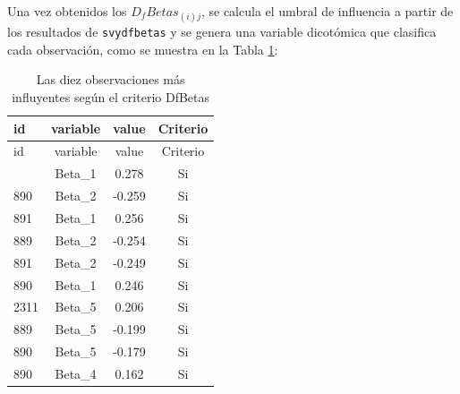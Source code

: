 \documentclass[
  spanish,
  12pt,
]{book}
\newenvironment{Shaded}{\begin{snugshade}}{\end{snugshade}}
\newcommand{\AttributeTok}[1]{\textcolor[rgb]{0.13,0.29,0.53}{#1}}
\newcommand{\DataTypeTok}[1]{\textcolor[rgb]{0.13,0.29,0.53}{#1}}
\newcommand{\DecValTok}[1]{\textcolor[rgb]{0.00,0.00,0.81}{#1}}
\newcommand{\FunctionTok}[1]{\textcolor[rgb]{0.13,0.29,0.53}{\textbf{#1}}}
\newcommand{\NormalTok}[1]{#1}
\newcommand{\OtherTok}[1]{\textcolor[rgb]{0.56,0.35,0.01}{#1}}
\newcommand{\SpecialCharTok}[1]{\textcolor[rgb]{0.81,0.36,0.00}{\textbf{#1}}}
\newcommand{\StringTok}[1]{\textcolor[rgb]{0.31,0.60,0.02}{#1}}
\begin{document}
Una vez obtenidos los \(D_{f}Betas_{\left(i\right)j}\), se calcula el umbral de influencia a partir de los resultados de \texttt{svydfbetas} y se genera una variable dicotómica que clasifica cada observación, como se muestra en la Tabla \ref{tab:tab-dfbetas-influyentes}:

\begin{Shaded}
\end{Shaded}

\begin{longtable}[]{@{}lccc@{}}
\caption{\label{tab:tab-dfbetas-influyentes}Las diez observaciones más influyentes según el criterio DfBetas}\tabularnewline
\toprule\noalign{}
id & variable & value & Criterio \\
\midrule\noalign{}
\endfirsthead
\toprule\noalign{}
id & variable & value & Criterio \\
\midrule\noalign{}
\endhead
\bottomrule\noalign{}
\endlastfoot
889 & Beta\_1 & 0.278 & Si \\
890 & Beta\_2 & -0.259 & Si \\
891 & Beta\_1 & 0.256 & Si \\
889 & Beta\_2 & -0.254 & Si \\
891 & Beta\_2 & -0.249 & Si \\
890 & Beta\_1 & 0.246 & Si \\
2311 & Beta\_5 & 0.206 & Si \\
889 & Beta\_5 & -0.199 & Si \\
890 & Beta\_5 & -0.179 & Si \\
890 & Beta\_4 & 0.162 & Si \\
\end{longtable}
\end{document}
